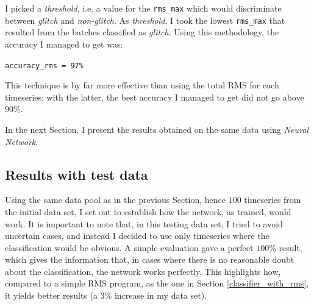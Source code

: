\documentclass[12pt,a4paper,final]{book}			%
\begin{document}
			I picked a \textit{threshold}, i.e. a  value for the \texttt{rms\_max} which would discriminate between \textit{glitch} and \textit{non-glitch}. As \textit{threshold}, I took the lowest \texttt{rms\_max} that resulted from the batches classified as \textit{glitch}. 
			Using this methodology, the accuracy I managed to get was:
			\begin{center}
				\texttt{accuracy\_rms = 97\%}
			\end{center}
			This technique is by far more effective than using the total RMS for each timeseries: with the latter, the best accuracy I managed to get did not go above $90\%$.
			
			In the next Section, I present the results obtained on the same data using \textit{Neural Network}.
			
			\subsection{Results with test data}
				Using the same data pool as in the previous Section, hence $100$ timeseries from the initial data set, I set out to establish how the network, as trained, would work. It is important to note that, in this testing data set, I tried to avoid uncertain cases, and instead I decided to use only timeseries where the classification would be obvious. 
				A simple evaluation gave a perfect $100\%$ result, which gives the information that, in cases where there is no reasonable doubt about the classification, the network works perfectly. This highlights how, compared to a simple RMS program, as the one in Section \ref{classifier_with_rms}, it yields better results (a $3\%$ increase in my data set).				
				
\end{document}
